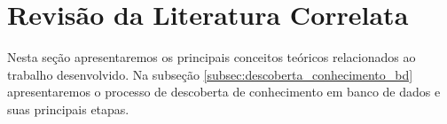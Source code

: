 \section{Revisão da Literatura Correlata} \label{sec:fundamentacao_teorica}

Nesta seção apresentaremos os principais conceitos teóricos relacionados ao
trabalho desenvolvido. Na subseção \ref{subsec:descoberta_conhecimento_bd}
apresentaremos o processo de descoberta de conhecimento em banco de dados e
suas principais etapas. 










